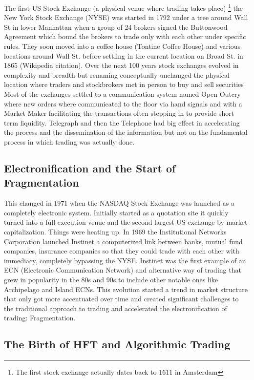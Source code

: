 The first US Stock Exchange (a physical venue where trading takes place) \footnote{The first stock exchange actually dates back to 1611 in Amsterdam} the New York Stock Exchange (NYSE) was started in 1792 under a tree around Wall St in lower Manhattan when a group of 24 brokers signed the Buttonwood Agreement which bound the brokers to trade only with each other under specific rules. They soon moved into a coffee house (Tontine Coffee House) and various locations around Wall St. before settling in the current location on Broad St. in 1865 (Wikipedia citation). Over the next 100 years stock exchanges evolved in complexity and breadth but renaming conceptually unchanged the physical location where traders and stockbrokers met in person to buy and sell securities Most of the exchanges settled to a communication system named Open Outcry where new orders where communicated to the floor via hand signals and with a Market Maker facilitating the transactions often stepping in to provide short term liquidity. Telegraph and then the Telephone had big effect in accelerating the process and the dissemination of the information but not on the fundamental process in which trading was actually done. 


\subsection{Electronification and the Start of Fragmentation}


This changed in 1971 when the NASDAQ Stock Exchange was launched as a completely electronic system. Initially started as a quotation site it quickly turned into a full execution venue and the second largest US exchange by market capitalization. Things were heating up. In 1969 the Institutional Networks Corporation launched Instinet a computerized link between banks, mutual fund companies, insurance companies so that they could trade with each other with immediacy, completely bypassing the NYSE.  Instinet was the first example of an ECN (Electronic Communication Network) and alternative way of trading that grew in popularity in the 80s and 90s to include other notable ones like Archipelago and Island ECNs. This evolution started a trend in market structure that only got more accentuated over time and created significant challenges to the traditional approach to trading and accelerated the electronification of trading: Fragmentation.


\subsection{The Birth of HFT and Algorithmic Trading}


